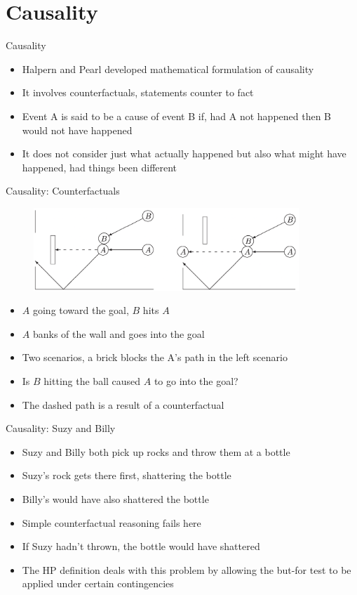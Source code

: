 \section{Causality}

\begin{frame}{Causality}
    \begin{itemize}
        \item Halpern and Pearl developed mathematical formulation of causality
        \item It involves counterfactuals, statements counter to fact
        \item Event A is said to be a cause of event B if, had A not happened then B would not have happened
        \item It does not consider just what actually happened but also what might have happened, had things been different
    \end{itemize}
\end{frame}

\begin{frame}{Causality: Counterfactuals}
    \begin{figure}
        \centering
        \includegraphics[width=10cm]{resources/balls.png}
    \end{figure}
    \begin{itemize}
        \item $A$ going toward the goal, $B$ hits $A$
        \item $A$ banks of the wall and goes into the goal
        \item Two scenarios, a brick blocks the A's path in the left scenario
        \item Is $B$ hitting the ball caused $A$ to go into the goal?
        \item The dashed path is a result of a counterfactual
    \end{itemize}
\end{frame}

\begin{frame}{Causality: Suzy and Billy}
    \begin{itemize}
        \item Suzy and Billy both pick up rocks and throw them at a bottle
        \item Suzy’s rock gets there first, shattering the bottle
        \item Billy’s would have also shattered the bottle 
        \item Simple counterfactual reasoning fails here
        \item If Suzy hadn’t thrown, the bottle would have shattered
        \item The HP definition deals with this problem by allowing the but-for test to be applied under certain contingencies
    \end{itemize}
\end{frame}

